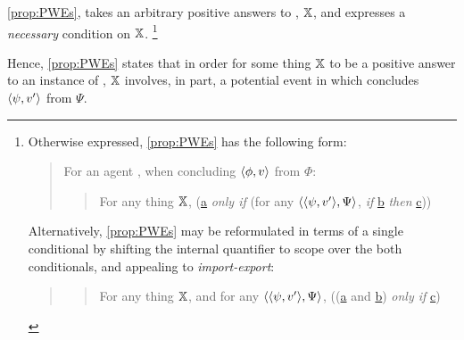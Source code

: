 \begin{note}
  \autoref{prop:PWEs}, takes an arbitrary positive answers to \qzS{}, \(\qzSaV{}\), and expresses a \emph{necessary} condition on \(\qzSaV{}\).%
  \footnote{
    Otherwise expressed, \autoref{prop:PWEs} has the following form:

    \begin{quote}
      For an agent \vAgent{}, when concluding \(\pv{\phi}{v}\) from \(\Phi\):
      \begin{quote}
        For any thing \(\qzSaV{}\), (\hyperref[prop:PWEs:a]{a} \emph{only if} (for any \(\pvp{\psi}{v'}{\Psi}\), \emph{if} \hyperref[prop:PWEs:b]{b} \emph{then} \hyperref[prop:PWEs:c]{c}))
      \end{quote}
    \end{quote}
    Alternatively, \autoref{prop:PWEs} may be reformulated in terms of a single conditional by shifting the internal quantifier to scope over the both conditionals, and appealing to \emph{import-export}:
    \begin{quote}
      \begin{quote}
        For any thing \(\qzSaV{}\), and for any \(\pvp{\psi}{v'}{\Psi}\), ((\hyperref[prop:PWEs:a]{a} and \hyperref[prop:PWEs:b]{b}) \emph{only if} \hyperref[prop:PWEs:c]{c})
      \end{quote}
    \end{quote}
  }

  Hence, \autoref{prop:PWEs} states that in order for some thing \(\qzSaV{}\) to be a positive answer to an instance of \qzS{}, \(\qzSaV{}\) involves, in part, a potential event in which \vAgent{} concludes \(\pv{\psi}{v'}\) from \(\Psi\).
\end{note}

